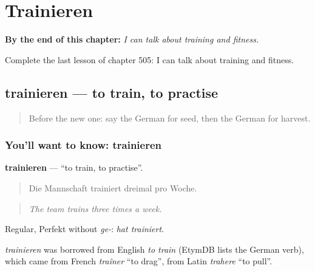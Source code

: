 
\chapter{Trainieren}
\label{ch:ge-trainieren}

\begin{chapteropening}
\textbf{By the end of this chapter:} \emph{I can talk about training and fitness.}

Complete the last lesson of chapter 505: I can talk about training and fitness.
\end{chapteropening}

\section[trainieren]{trainieren — to train, to practise}

\label{lesson:GE-C505-trainieren}



\begin{quote}
Before the new one: say the German for seed, then the German for harvest.
\end{quote}

\subsection*{You'll want to know: trainieren}
\textbf{trainieren} — \textquotedblleft{}to train, to practise\textquotedblright{}.

\begin{quote}
Die Mannschaft trainiert dreimal pro Woche.
\end{quote}

\begin{quote}
\emph{The team trains three times a week.}
\end{quote}

Regular, Perfekt without \emph{ge-}: \emph{hat trainiert}.

\begin{cousinweb}
\emph{trainieren} was borrowed from English \emph{to train} (EtymDB lists the German verb), which came from French \emph{traîner} \textquotedblleft{}to drag\textquotedblright{}, from Latin \emph{trahere} \textquotedblleft{}to pull\textquotedblright{}.
\end{cousinweb}


